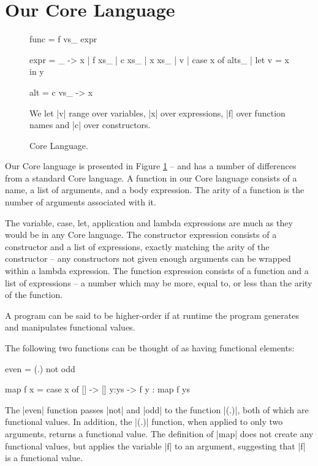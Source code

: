 \documentclass[preprint]{sigplanconf}
\begin{document}
\section{Our Core Language}

\begin{figure}
\begin{code}
func = f vs_ expr

expr  =  \vs_ -> x
      |  f xs_
      |  c xs_
      |  x xs_
      |  v
      |  case x of alts_
      |  let v = x in y

alt = c vs_ -> x
\end{code}

We let |v| range over variables, |x| over expressions, |f| over function names and |c| over constructors.
\caption{Core Language.}
\label{fig:core}
\end{figure}

Our Core language is presented in Figure \ref{fig:core} -- and has a number of differences from a standard Core language. A function in our Core language consists of a name, a list of arguments, and a body expression. The arity of a function is the number of arguments associated with it.

The variable, case, let, application and lambda expressions are much as they would be in any Core language. The constructor expression consists of a constructor and a list of expressions, exactly matching the arity of the constructor -- any constructors not given enough arguments can be wrapped within a lambda expression. The function expression consists of a function and a list of expressions -- a number which may be more, equal to, or less than the arity of the function.

A program can be said to be higher-order if at runtime the program generates and manipulates functional values.

\begin{example}
\label{ex:ho_elements}
The following two functions can be thought of as having functional elements:

\begin{code}
even = (.) not odd

map f x = case  x of
                []    -> []
                y:ys  -> f y : map f ys
\end{code}

The |even| function passes |not| and |odd| to the function |(.)|, both of which are functional values. In addition, the |(.)| function, when applied to only two arguments, returns a functional value. The definition of |map| does not create any functional values, but applies the variable |f| to an argument, suggesting that |f| is a functional value.
\end{example}
\end{document}

